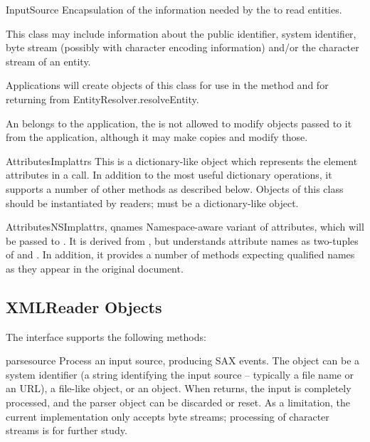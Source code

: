 \begin{classdesc}{InputSource}{}
  Encapsulation of the information needed by the  to
  read entities.

  This class may include information about the public identifier,
  system identifier, byte stream (possibly with character encoding
  information) and/or the character stream of an entity.

  Applications will create objects of this class for use in the
   method and for returning from
  EntityResolver.resolveEntity.

  An  belongs to the application, the
   is not allowed to modify  objects
  passed to it from the application, although it may make copies and
  modify those.
\end{classdesc}

\begin{classdesc}{AttributesImpl}{attrs}
  This is a dictionary-like object which represents the element
  attributes in a  call. In addition to the
  most useful dictionary operations, it supports a number of other
  methods as described below. Objects of this class should be
  instantiated by readers;  must be a dictionary-like
  object.
\end{classdesc}

\begin{classdesc}{AttributesNSImpl}{attrs, qnames}
  Namespace-aware variant of attributes, which will be passed to
  . It is derived from ,
  but understands attribute names as two-tuples of 
  and . In addition, it provides a number of methods
  expecting qualified names as they appear in the original document.
\end{classdesc}


\subsection{XMLReader Objects \label{xmlreader-objects}}

The  interface supports the following methods:

\begin{methoddesc}[XMLReader]{parse}{source}
  Process an input source, producing SAX events. The 
  object can be a system identifier (a string identifying the
  input source -- typically a file name or an URL), a file-like
  object, or an  object. When 
  returns, the input is completely processed, and the parser object
  can be discarded or reset. As a limitation, the current implementation
  only accepts byte streams; processing of character streams is for
  further study.
\end{methoddesc}

